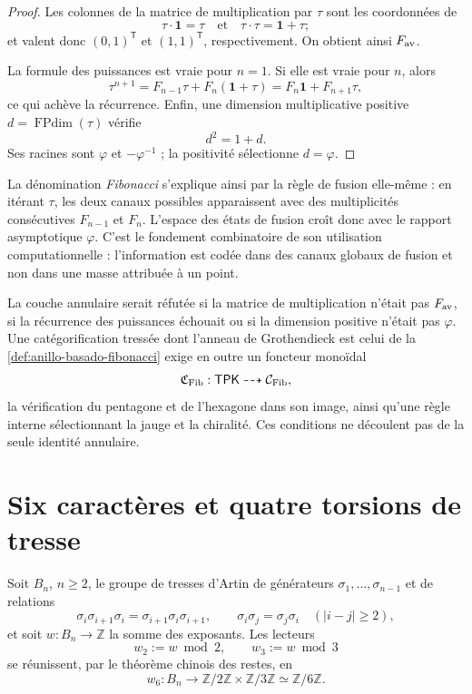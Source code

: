 \begin{proof}
Les colonnes de la matrice de multiplication par \(\tau\) sont les coordonnées de
\[
 \tau\cdot\mathbf 1=\tau
 \quad\text{et}\quad
 \tau\cdot\tau=\mathbf 1+\tau;
\]
et valent donc \((0,1)^{\mathsf T}\) et \((1,1)^{\mathsf T}\), respectivement. On obtient ainsi \(F_{\rm av}\).

La formule des puissances est vraie pour \(n=1\). Si elle est vraie pour \(n\), alors
\[
 \tau^{n+1}
 =F_{n-1}\tau+F_n(\mathbf 1+\tau)
 =F_n\mathbf 1+F_{n+1}\tau,
\]
ce qui achève la récurrence. Enfin, une dimension multiplicative positive \(d=\operatorname{FPdim}(\tau)\) vérifie
\[
 d^2=1+d.
\]
Ses racines sont \(\varphi\) et \(-\varphi^{-1}\) ; la positivité sélectionne \(d=\varphi\).
\end{proof}

La dénomination \emph{Fibonacci} s’explique ainsi par la règle de fusion elle-même : en itérant \(\tau\), les deux canaux possibles apparaissent avec des multiplicités consécutives \(F_{n-1}\) et \(F_n\). L’espace des états de fusion croît donc avec le rapport asymptotique \(\varphi\). C’est le fondement combinatoire de son utilisation computationnelle : l’information est codée dans des canaux globaux de fusion et non dans une masse attribuée à un point.

\begin{criterion} \label{crit:categorificacion-fibonacci} La couche annulaire serait réfutée si la matrice de multiplication n’était pas \(F_{\rm av}\), si la récurrence des puissances échouait ou si la dimension positive n’était pas \(\varphi\). Une catégorification tressée dont l’anneau de Grothendieck est celui de la \cref{def:anillo-basado-fibonacci} exige en outre un foncteur monoïdal
\[
 \mathfrak C_{\rm Fib}:\mathsf{TPK}
 \dashrightarrow\mathcal C_{\rm Fib},
\]
la vérification du pentagone et de l’hexagone dans son image, ainsi qu’une règle interne sélectionnant la jauge et la chiralité. Ces conditions ne découlent pas de la seule identité annulaire.
\end{criterion}

\section[Caractères de tresse]{Six caractères et quatre torsions de tresse}
\label{sec:rescate-trenzas-ex02}

Soit \(B_n\), \(n\geq2\), le groupe de tresses d’Artin de générateurs \(\sigma_1,\ldots,\sigma_{n-1}\) et de relations
\[
 \sigma_i\sigma_{i+1}\sigma_i
 =\sigma_{i+1}\sigma_i\sigma_{i+1},
 \qquad
 \sigma_i\sigma_j=\sigma_j\sigma_i\quad(|i-j|\geq2),
\]
et soit \(w:B_n\to\mathbb Z\) la somme des exposants. Les lecteurs
\[
 w_2:=w\bmod2,\qquad w_3:=w\bmod3
\]
se réunissent, par le théorème chinois des restes, en
\[
 w_6:B_n\longrightarrow
 \mathbb Z/2\mathbb Z\times\mathbb Z/3\mathbb Z
 \simeq\mathbb Z/6\mathbb Z.
\]

